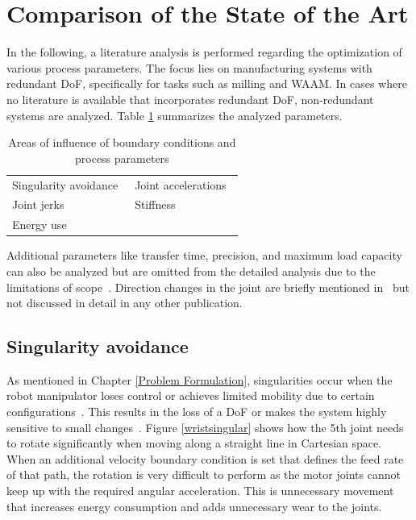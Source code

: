 \section{Comparison of the State of the Art }\label{comp}

In the following, a literature analysis is performed regarding the optimization of various process parameters. The focus lies on manufacturing systems with redundant \acrshort{DoF}, specifically for tasks such as milling and \acrshort{WAAM}. In cases where no literature is available that incorporates redundant \acrshort{DoF}, non-redundant systems are analyzed.
Table \ref{parameter} summarizes the analyzed parameters. 


\begin{table} [H]
	\centering
	\begin{tabular}{|l|l|}
		\hline
		\hline
		Singularity avoidance~\cite{Huo.2008} & Joint accelerations~\cite{Gasparetto.2010}\\
		Joint jerks~\cite{Gasparetto.2010} & Stiffness~\cite{Cvitanic.2020} \\
		Energy use~\cite{Paryanto.2015} & \\
		\hline
		\hline
		
	\end{tabular}
	
	
	\caption{Areas of influence of boundary conditions and process parameters}
	\label{parameter}
\end{table}

Additional parameters like transfer time, precision, and maximum load capacity can also be analyzed but are omitted from the detailed analysis due to the limitations of scope~\cite{Breaz.2017, Hirzinger.2005, Pham.2018}. Direction changes in the joint are briefly mentioned in~\cite{Halbauer.2013} but not discussed in detail in any other publication.

\subsection{Singularity avoidance}\label{Singularity avoidance}
As mentioned in Chapter \ref{Problem Formulation}, singularities occur when the robot manipulator loses control or achieves limited mobility due to certain configurations~\cite{Malyshev.2022}. This results in the loss of a \acrshort{DoF} or makes the system highly sensitive to small changes~\cite{Zhao.2021, Milenkovic.2021}.
Figure \ref{wristsingular} shows how the 5th joint needs to rotate significantly when moving along a straight line in Cartesian space. When an additional velocity boundary condition is set that defines the feed rate of that path, the rotation is very difficult to perform as the motor joints cannot keep up with the required angular acceleration. This is unnecessary movement that increases energy consumption and adds unnecessary wear to the joints. 



